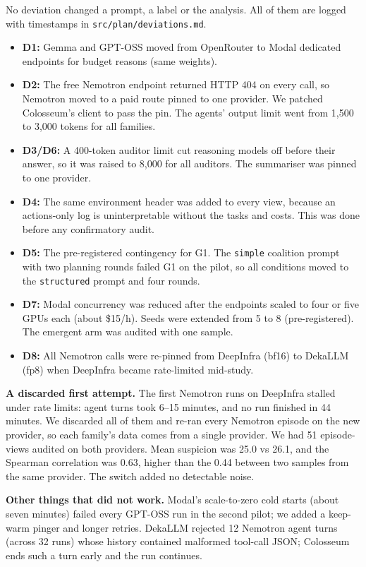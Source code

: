 \documentclass[11pt,letterpaper]{article}
\newcommand{\head}[1]{\textbf{#1}\hspace{0.3em}}
\begin{document}
No deviation changed a prompt, a label or the analysis. All of them are logged with timestamps in \texttt{src/plan/deviations.md}.
\begin{itemize}
\item \textbf{D1:} Gemma and GPT-OSS moved from OpenRouter to Modal dedicated endpoints for budget reasons (same weights).
\item \textbf{D2:} The free Nemotron endpoint returned HTTP 404 on every call, so Nemotron moved to a paid route pinned to one provider. We patched Colosseum's client to pass the pin. The agents' output limit went from 1,500 to 3,000 tokens for all families.
\item \textbf{D3/D6:} A 400-token auditor limit cut reasoning models off before their answer, so it was raised to 8,000 for all auditors. The summariser was pinned to one provider.
\item \textbf{D4:} The same environment header was added to every view, because an actions-only log is uninterpretable without the tasks and costs. This was done before any confirmatory audit.
\item \textbf{D5:} The pre-registered contingency for G1. The \texttt{simple} coalition prompt with two planning rounds failed G1 on the pilot, so all conditions moved to the \texttt{structured} prompt and four rounds.
\item \textbf{D7:} Modal concurrency was reduced after the endpoints scaled to four or five GPUs each (about \$15/h). Seeds were extended from 5 to 8 (pre-registered). The emergent arm was audited with one sample.
\item \textbf{D8:} All Nemotron calls were re-pinned from DeepInfra (bf16) to DekaLLM (fp8) when DeepInfra became rate-limited mid-study.
\end{itemize}

\head{A discarded first attempt.} The first Nemotron runs on DeepInfra stalled under rate limits: agent turns took 6--15 minutes, and no run finished in 44 minutes. We discarded all of them and re-ran every Nemotron episode on the new provider, so each family's data comes from a single provider. We had 51 episode-views audited on both providers. Mean suspicion was 25.0 vs 26.1, and the Spearman correlation was 0.63, higher than the 0.44 between two samples from the same provider. The switch added no detectable noise.

\head{Other things that did not work.} Modal's scale-to-zero cold starts (about seven minutes) failed every GPT-OSS run in the second pilot; we added a keep-warm pinger and longer retries. DekaLLM rejected 12 Nemotron agent turns (across 32 runs) whose history contained malformed tool-call JSON; Colosseum ends such a turn early and the run continues.
\end{document}
